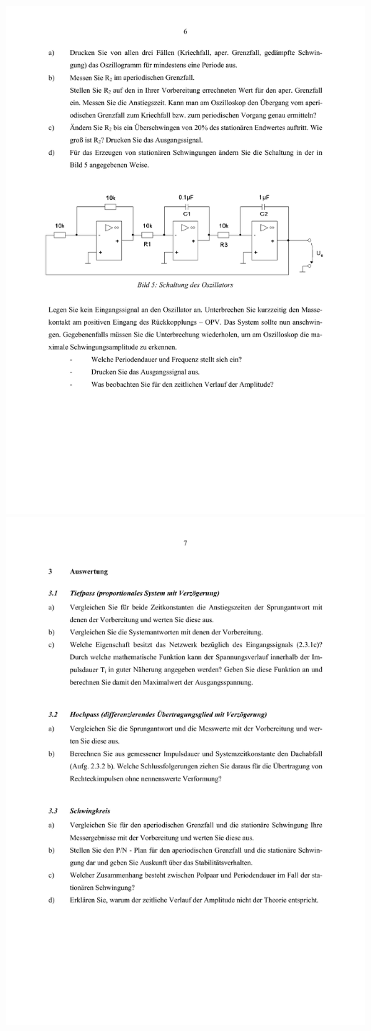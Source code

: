 \includegraphics[width=1.0\textwidth]{Bilder/Grundubertragungsglieder im Zeitbereich (verschoben) 6}\newpage
\includegraphics[width=1.0\textwidth]{Bilder/Grundubertragungsglieder im Zeitbereich (verschoben) 7}\newpage


